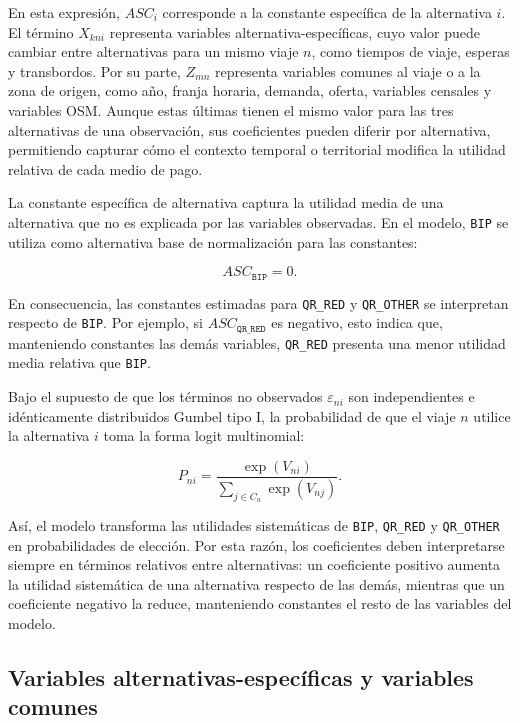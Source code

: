 En esta expresión, \(ASC_i\) corresponde a la constante específica de la alternativa \(i\).
El término \(X_{kni}\) representa variables alternativa-específicas, cuyo valor puede cambiar entre
alternativas para un mismo viaje \(n\), como tiempos de viaje, esperas y transbordos. Por su parte,
\(Z_{mn}\) representa variables comunes al viaje o a la zona de origen, como año, franja horaria,
demanda, oferta, variables censales y variables OSM. Aunque estas últimas tienen el mismo valor para
las tres alternativas de una observación, sus coeficientes pueden diferir por alternativa,
permitiendo capturar cómo el contexto temporal o territorial modifica la utilidad relativa de cada
medio de pago.

La constante específica de alternativa captura la utilidad media de una alternativa que no es explicada por las variables observadas. En el modelo, \texttt{BIP} se utiliza como alternativa base de normalización para las constantes:

\begin{equation}
    ASC_{\texttt{BIP}} = 0.
\end{equation}

En consecuencia, las constantes estimadas para \texttt{QR\_RED} y \texttt{QR\_OTHER} se interpretan respecto de \texttt{BIP}. Por ejemplo, si \(ASC_{\texttt{QR\_RED}}\) es negativo, esto indica que, manteniendo constantes las demás variables, \texttt{QR\_RED} presenta una menor utilidad media relativa que \texttt{BIP}.

Bajo el supuesto de que los términos no observados \(\varepsilon_{ni}\) son independientes e idénticamente distribuidos Gumbel tipo I, la probabilidad de que el viaje \(n\) utilice la alternativa \(i\) toma la forma logit multinomial:

\begin{equation}
    P_{ni}
    =
    \frac{\exp(V_{ni})}
    {\sum_{j \in C_n} \exp(V_{nj})}.
\end{equation}

Así, el modelo transforma las utilidades sistemáticas de \texttt{BIP}, \texttt{QR\_RED} y \texttt{QR\_OTHER} en probabilidades de elección. Por esta razón, los coeficientes deben interpretarse siempre en términos relativos entre alternativas: un coeficiente positivo aumenta la utilidad sistemática de una alternativa respecto de las demás, mientras que un coeficiente negativo la reduce, manteniendo constantes el resto de las variables del modelo.

\subsection{Variables alternativas-específicas y variables comunes}

